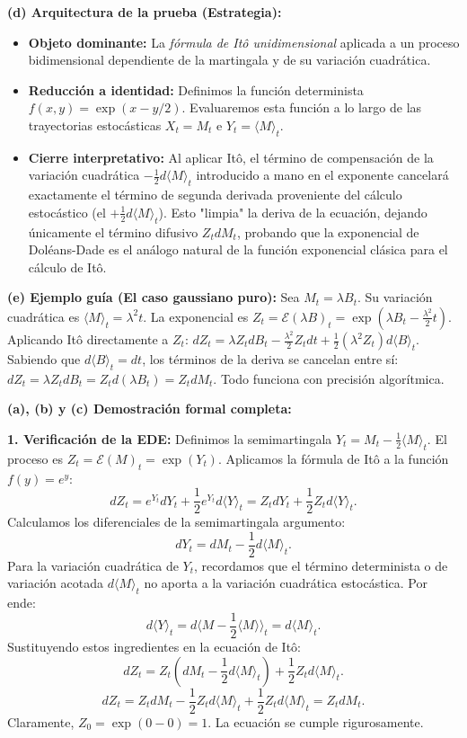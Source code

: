 \documentclass[11pt, letterpaper]{article}
\begin{document}
\begin{solucion}
    \textbf{(d) Arquitectura de la prueba (Estrategia):}
    \begin{itemize}
        \item[(i)] \textbf{Objeto dominante:} La \textit{fórmula de Itô unidimensional} aplicada a un proceso bidimensional dependiente de la martingala y de su variación cuadrática.
        \item[(ii)] \textbf{Reducción a identidad:} Definimos la función determinista $f(x, y) = \exp(x - y/2)$. Evaluaremos esta función a lo largo de las trayectorias estocásticas $X_t = M_t$ e $Y_t = \langle M \rangle_t$.
        \item[(iii)] \textbf{Cierre interpretativo:} Al aplicar Itô, el término de compensación de la variación cuadrática $-\frac{1}{2}d\langle M \rangle_t$ introducido a mano en el exponente cancelará exactamente el término de segunda derivada proveniente del cálculo estocástico (el $+ \frac{1}{2} d\langle M \rangle_t$). Esto "limpia" la deriva de la ecuación, dejando únicamente el término difusivo $Z_t dM_t$, probando que la exponencial de Doléans-Dade es el análogo natural de la función exponencial clásica para el cálculo de Itô.
    \end{itemize}

    \vspace{3mm}
    \textbf{(e) Ejemplo guía (El caso gaussiano puro):}
    Sea $M_t = \lambda B_t$. Su variación cuadrática es $\langle M \rangle_t = \lambda^2 t$.
    La exponencial es $Z_t = \mathcal{E}(\lambda B)_t = \exp\left(\lambda B_t - \frac{\lambda^2}{2}t\right)$.
    Aplicando Itô directamente a $Z_t$:
    $dZ_t = \lambda Z_t dB_t - \frac{\lambda^2}{2} Z_t dt + \frac{1}{2}(\lambda^2 Z_t) d\langle B \rangle_t$.
    Sabiendo que $d\langle B \rangle_t = dt$, los términos de la deriva se cancelan entre sí:
    $dZ_t = \lambda Z_t dB_t = Z_t d(\lambda B_t) = Z_t dM_t$. Todo funciona con precisión algorítmica.

    \textbf{(a), (b) y (c) Demostración formal completa:}

    \textbf{1. Verificación de la EDE:}
    Definimos la semimartingala $Y_t = M_t - \frac{1}{2}\langle M \rangle_t$. El proceso es $Z_t = \mathcal{E}(M)_t = \exp(Y_t)$.
    Aplicamos la fórmula de Itô a la función $f(y) = e^y$:
    \[ dZ_t = e^{Y_t} dY_t + \frac{1}{2} e^{Y_t} d\langle Y \rangle_t = Z_t dY_t + \frac{1}{2} Z_t d\langle Y \rangle_t. \]
    Calculamos los diferenciales de la semimartingala argumento:
    \[ dY_t = dM_t - \frac{1}{2} d\langle M \rangle_t. \]
    Para la variación cuadrática de $Y_t$, recordamos que el término determinista o de variación acotada $d\langle M \rangle_t$ no aporta a la variación cuadrática estocástica. Por ende:
    \[ d\langle Y \rangle_t = d\langle M - \frac{1}{2}\langle M \rangle \rangle_t = d\langle M \rangle_t. \]
    Sustituyendo estos ingredientes en la ecuación de Itô:
    \[ dZ_t = Z_t \left( dM_t - \frac{1}{2} d\langle M \rangle_t \right) + \frac{1}{2} Z_t d\langle M \rangle_t. \]
    \[ dZ_t = Z_t dM_t - \frac{1}{2} Z_t d\langle M \rangle_t + \frac{1}{2} Z_t d\langle M \rangle_t = Z_t dM_t. \]
    Claramente, $Z_0 = \exp(0 - 0) = 1$. La ecuación se cumple rigurosamente.


\end{solucion}
\end{document}
